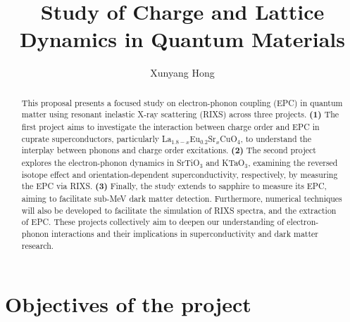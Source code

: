 \documentclass[11pt]{article}
\begin{document}
\title{Study of Charge and Lattice Dynamics in Quantum Materials}
\author{Xunyang Hong}
\date{}
\maketitle





\begin{abstract}
This proposal presents a focused study on electron-phonon coupling (EPC) in quantum matter using resonant inelastic X-ray scattering (RIXS) across three projects. \textbf{(1)} The first project aims to investigate the interaction between charge order and EPC in cuprate superconductors, particularly {La$_{1.8-x}$Eu$_{0.2}$Sr$_x$CuO$_{4}$}, to understand the interplay between phonons and charge order excitations. \textbf{(2)} The second project explores the electron-phonon dynamics in SrTiO$_{3}$ and KTaO$_{3}$, examining the reversed isotope effect and orientation-dependent superconductivity, respectively, by measuring the EPC via RIXS. \textbf{(3)} Finally, the study extends to sapphire to measure its EPC, aiming to facilitate sub-MeV dark matter detection.
Furthermore, numerical techniques will also be developed to facilitate the simulation of RIXS spectra, and the extraction of EPC. These projects collectively aim to deepen our understanding of electron-phonon interactions and their implications in superconductivity and dark matter research.
\end{abstract}

\section{Objectives of the project}

\end{document}
